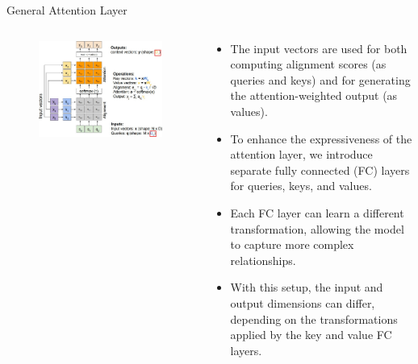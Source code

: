 \begin{frame}[allowframebreaks]{General Attention Layer}
    \begin{columns}
    \begin{column}{0.6\textwidth}
        \begin{figure}
            \flushleft
            \includegraphics[width=\linewidth,height=\textheight,keepaspectratio]{images/transformers/slide_40_1_img.jpg}
        \end{figure}
    \end{column}
    \begin{column}{0.5\textwidth}
        \begin{justify}
            \begin{itemize}
                \item The input vectors are used for both computing alignment scores (as queries and keys) and for generating the attention-weighted output (as values).
                \item To enhance the expressiveness of the attention layer, we introduce separate fully connected (FC) layers for queries, keys, and values.
                \item Each FC layer can learn a different transformation, allowing the model to capture more complex relationships.
                \item With this setup, the input and output dimensions can differ, depending on the transformations applied by the key and value FC layers.
            \end{itemize}
        \end{justify}
    \end{column}
    \end{columns}
    
\end{frame}
